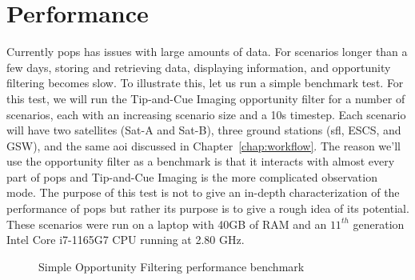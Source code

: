 %

\section{Performance}

Currently \gls{pops} has issues with large amounts of data. For scenarios
longer than a few days, storing and retrieving data, displaying information,
and opportunity filtering becomes slow. To illustrate this, let us run a simple
benchmark test. For this test, we will run the Tip-and-Cue Imaging opportunity
filter for a number of scenarios, each with an increasing scenario size and a
10s timestep. Each scenario will have two satellites (Sat-A and Sat-B), three
ground stations (\acrshort{sfl}, ESCS, and GSW), and the same \gls{aoi}
discussed in Chapter~\ref{chap:workflow}. The reason we'll use the opportunity
filter as a benchmark is that it interacts with almost every part of \gls{pops}
and Tip-and-Cue Imaging is the more complicated observation mode.
The purpose of this test is not to give an in-depth characterization of the
performance of \gls{pops} but rather its purpose is to give a rough idea of its
potential.  These scenarios were run on a laptop with 40GB of RAM and an
$11^{th}$ generation Intel Core i7-1165G7 CPU running at 2.80 GHz. 


\begin{figure}[h]
    \centering
    \caption{Simple Opportunity Filtering performance benchmark}
    \label{fig:performance-benchmark}
\end{figure}

